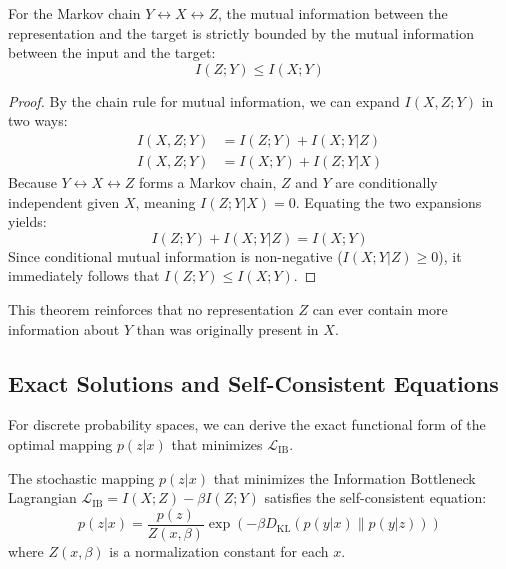 \begin{theorem}
    For the Markov chain $Y \leftrightarrow X \leftrightarrow Z$, the mutual information between the representation and the target is strictly bounded by the mutual information between the input and the target:
    \begin{equation}
        I(Z; Y) \le I(X; Y)
    \end{equation}
\end{theorem}
\begin{proof}
    By the chain rule for mutual information, we can expand $I(X, Z; Y)$ in two ways:
    \begin{align}
        I(X, Z; Y) &= I(Z; Y) + I(X; Y | Z) \\
        I(X, Z; Y) &= I(X; Y) + I(Z; Y | X)
    \end{align}
    Because $Y \leftrightarrow X \leftrightarrow Z$ forms a Markov chain, $Z$ and $Y$ are conditionally independent given $X$, meaning $I(Z; Y | X) = 0$. Equating the two expansions yields:
    \begin{equation}
        I(Z; Y) + I(X; Y | Z) = I(X; Y)
    \end{equation}
    Since conditional mutual information is non-negative ($I(X; Y | Z) \ge 0$), it immediately follows that $I(Z; Y) \le I(X; Y)$. 
\end{proof}
This theorem reinforces that no representation $Z$ can ever contain more information about $Y$ than was originally present in $X$.

\subsection{Exact Solutions and Self-Consistent Equations}

For discrete probability spaces, we can derive the exact functional form of the optimal mapping $p(z|x)$ that minimizes $\mathcal{L}_{\text{IB}}$.

\begin{theorem}
    \label{thm:ib_equations}
    The stochastic mapping $p(z|x)$ that minimizes the Information Bottleneck Lagrangian $\mathcal{L}_{\text{IB}} = I(X; Z) - \beta I(Z; Y)$ satisfies the self-consistent equation:
    \begin{equation}
        p(z|x) = \frac{p(z)}{Z(x, \beta)} \exp\left(-\beta D_{\text{KL}}(p(y|x) \parallel p(y|z))\right)
    \end{equation}
    where $Z(x, \beta)$ is a normalization constant for each $x$.
\end{theorem}

